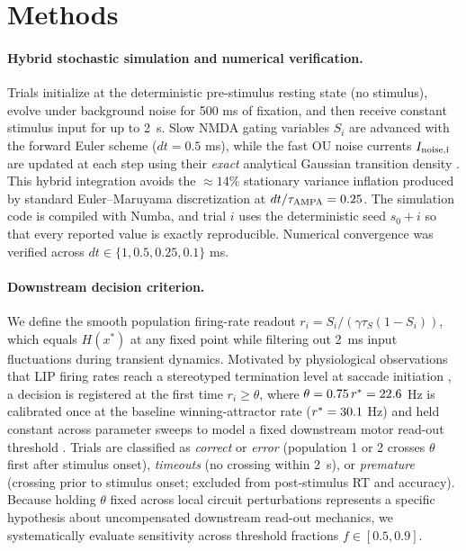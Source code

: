 \documentclass[11pt]{article}
\begin{document}
	\section{Methods}
	\paragraph{Hybrid stochastic simulation and numerical verification.} Trials initialize at the deterministic pre-stimulus resting state (no stimulus), evolve under background noise for 500 ms of fixation, and then receive constant stimulus input for up to 2~s. Slow NMDA gating variables $S_i$ are advanced with the forward Euler scheme ($dt=0.5$ ms), while the fast OU noise currents $I_{\rm noise,i}$ are updated at each step using their \emph{exact} analytical Gaussian transition density \citep{Gillespie1996}. This hybrid integration avoids the $\approx 14\%$ stationary variance inflation produced by standard Euler--Maruyama discretization at $dt/\tau_{\rm AMPA}=0.25$. The simulation code is compiled with Numba, and trial $i$ uses the deterministic seed $s_0+i$ so that every reported value is exactly reproducible. Numerical convergence was verified across $dt\in\{1,0.5,0.25,0.1\}$ ms.
	
	\paragraph{Downstream decision criterion.} We define the smooth population firing-rate readout $r_i=S_i/(\gamma\tau_S(1-S_i))$, which equals $H(x^*)$ at any fixed point while filtering out 2~ms input fluctuations during transient dynamics. Motivated by physiological observations that LIP firing rates reach a stereotyped termination level at saccade initiation \citep{RoitmanShadlen2002, Kiani2008, Hanks2014}, a decision is registered at the first time $r_i\ge\theta$, where $\theta=0.75\,r^*=22.6$ Hz is calibrated once at the baseline winning-attractor rate ($r^*=30.1$ Hz) and held constant across parameter sweeps to model a fixed downstream motor read-out threshold \citep{Standage2011, Standage2014}. Trials are classified as \emph{correct} or \emph{error} (population 1 or 2 crosses $\theta$ first after stimulus onset), \emph{timeouts} (no crossing within 2~s), or \emph{premature} (crossing prior to stimulus onset; excluded from post-stimulus RT and accuracy). Because holding $\theta$ fixed across local circuit perturbations represents a specific hypothesis about uncompensated downstream read-out mechanics, we systematically evaluate sensitivity across threshold fractions $f\in[0.5,0.9]$.
	
\end{document}
